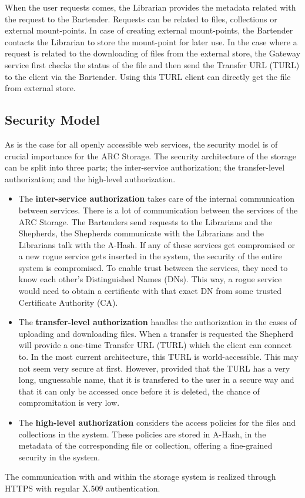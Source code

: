 \documentclass[final]{ieee}
\begin{document}
When the user requests comes, the Librarian provides the metadata related
with the request to the Bartender. Requests can be related to
files, collections or external mount-points. In case of creating
external mount-points, the Bartender contacts the Librarian to store
the mount-point for later use. In the case where a request is related
to the downloading of files from the external store, the Gateway service first checks the status of the file
and then send the Transfer URL (TURL) to the client via the
Bartender. Using this TURL client can directly get the file from
external store. %

\subsection{Security Model }
\label{Security Model }

As is the case for all openly accessible web services, the security
model is of crucial importance for the ARC Storage. The security
architecture of the storage can be split into three parts; the
inter-service authorization; the transfer-level authorization; and the
high-level authorization.
\begin{itemize}
\item The \textbf{inter-service authorization} takes care of the
  internal communication between services. There is a lot of
  communication between the services of the ARC Storage. The
  Bartenders send requests to the Librarians and the Shepherds, the
  Shepherds communicate with the Librarians and the Librarians talk with
  the A-Hash. If any of these services get compromised or a new
  rogue service gets inserted in the system, the security of the
  entire system is compromised. To enable trust between the services,
  they need to know each other's Distinguished Names (DNs). This way,
  a rogue service would need to obtain a certificate with that exact
  DN from some trusted Certificate Authority (CA).
\item The \textbf{transfer-level authorization} handles the
  authorization in the cases of uploading and downloading files. When
  a transfer is requested the Shepherd will provide a one-time
  Transfer URL (TURL) which the client can connect to. In the most
  current architecture, this TURL is world-accessible. This may not seem
  very secure at first. However, provided that the TURL has a very long,
  unguessable name, that it is transfered to the user in a secure way
  and that it can only be accessed once before it is deleted, the
  chance of compromitation is very low.
\item The \textbf{high-level authorization} considers the access
  policies for the files and collections in the system. These policies
  are stored in A-Hash, in the metadata of the corresponding file or
  collection, offering a fine-grained security in the system.
\end{itemize}
The communication with and within the storage system is realized
through HTTPS with regular X.509 authentication.
\end{document}
